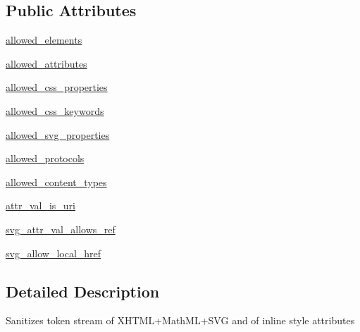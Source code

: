 \subsection*{Public Attributes}
\begin{DoxyCompactItemize}
\item 
\hyperlink{classpip_1_1__vendor_1_1html5lib_1_1filters_1_1sanitizer_1_1Filter_adcd9514fffd4234aa1285720ebfb7b17}{allowed\+\_\+elements}
\item 
\hyperlink{classpip_1_1__vendor_1_1html5lib_1_1filters_1_1sanitizer_1_1Filter_a6f70ea4be9c51b9b91c2e566559b884b}{allowed\+\_\+attributes}
\item 
\hyperlink{classpip_1_1__vendor_1_1html5lib_1_1filters_1_1sanitizer_1_1Filter_a416794d8c838f27522a46468132a39f3}{allowed\+\_\+css\+\_\+properties}
\item 
\hyperlink{classpip_1_1__vendor_1_1html5lib_1_1filters_1_1sanitizer_1_1Filter_a7c7289763ca64b15575862a15816afed}{allowed\+\_\+css\+\_\+keywords}
\item 
\hyperlink{classpip_1_1__vendor_1_1html5lib_1_1filters_1_1sanitizer_1_1Filter_af9bca56a7a284c172d28da58c49a87a2}{allowed\+\_\+svg\+\_\+properties}
\item 
\hyperlink{classpip_1_1__vendor_1_1html5lib_1_1filters_1_1sanitizer_1_1Filter_a0ae8ca41be5bfb1bff4fb2846216afa9}{allowed\+\_\+protocols}
\item 
\hyperlink{classpip_1_1__vendor_1_1html5lib_1_1filters_1_1sanitizer_1_1Filter_a12c8958496fa39ad6f2aa9048afe69b2}{allowed\+\_\+content\+\_\+types}
\item 
\hyperlink{classpip_1_1__vendor_1_1html5lib_1_1filters_1_1sanitizer_1_1Filter_a60507caa7929ffa5562fc2b0db08dc8b}{attr\+\_\+val\+\_\+is\+\_\+uri}
\item 
\hyperlink{classpip_1_1__vendor_1_1html5lib_1_1filters_1_1sanitizer_1_1Filter_af7642baad2028f0c8a9d5440e649b8b3}{svg\+\_\+attr\+\_\+val\+\_\+allows\+\_\+ref}
\item 
\hyperlink{classpip_1_1__vendor_1_1html5lib_1_1filters_1_1sanitizer_1_1Filter_a6eb108defa9bd58d65167a6cf3edf502}{svg\+\_\+allow\+\_\+local\+\_\+href}
\end{DoxyCompactItemize}


\subsection{Detailed Description}
\begin{DoxyVerb}Sanitizes token stream of XHTML+MathML+SVG and of inline style attributes\end{DoxyVerb}
 

